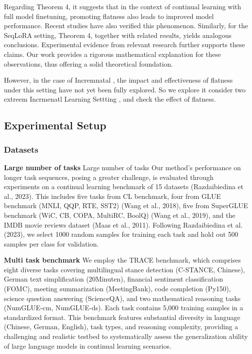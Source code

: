 \documentclass[letterpaper]{article} %
\begin{document}
Regarding Theorem 4, it suggests that in the context of continual learning with full model finetuning, promoting flatness also leads to improved model performance. Recent studies have also verified this phenomenon. Similarly, for the SeqLoRA setting, Theorem 4, together with related results, yields analogous conclusions. Experimental evidence from relevant research further supports these claims. Our work provides a rigorous mathematical explanation for these observations, thus offering a solid theoretical foundation.

However, in the case of Incremnatal , the impact and effectiveness of flatness under this setting have not yet been fully explored. So we explore it consider two extreem Incrmenatl Learning Settting , and check the effect of flatness. 


\subsection{Experimental Setup}
\subsubsection{Datasets}
\textbf{Large number of tasks}
Large number of tasks Our method’s performance on longer task sequences, posing a greater challenge, is evaluated through experiments on a continual learning benchmark of 15 datasets (Razdaibiedina et al., 2023). This includes five tasks from CL benchmark, four from GLUE benchmark (MNLI, QQP, RTE, SST2) (Wang et al., 2018), five from SuperGLUE benchmark (WiC, CB, COPA, MultiRC, BoolQ) (Wang et al., 2019), and the IMDB movie reviews dataset (Maas et al., 2011). Following Razdaibiedina et al. (2023), we select 1000 random samples for training each task and hold out 500 samples per class for validation.



\textbf{Multi task benchmark}
We employ the TRACE benchmark, which comprises eight diverse tasks covering multilingual stance detection (C-STANCE, Chinese), German text simplification (20Minuten), financial sentiment classification (FOMC), meeting summarization (MeetingBank), code completion (Py150), science question answering (ScienceQA), and two mathematical reasoning tasks (NumGLUE-cm, NumGLUE-ds). Each task contains 5,000 training samples in a standardized format. This benchmark features substantial diversity in language (Chinese, German, English), task types, and reasoning complexity, providing a challenging and realistic testbed to systematically assess the generalization ability of large language models in continual learning scenarios.
\end{document}
